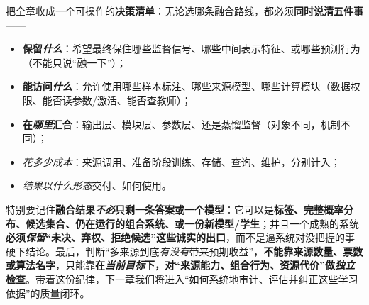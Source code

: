 把全章收成一个可操作的\textbf{决策清单}：无论选哪条融合路线，都必须\textbf{同时说清五件事}——
\begin{itemize}\item \textbf{保留\emph{什么}}：希望最终保住哪些监督信号、哪些中间表示特征、或哪些预测行为（不能只说“融一下”）；\item \textbf{能访问\emph{什么}}：允许使用哪些样本标注、哪些来源模型、哪些计算模块（数据权限、能否读参数/激活、能否查教师）；\item \textbf{在\emph{哪里}汇合}：输出层、模块层、参数层、还是蒸馏监督（对象不同，机制不同）；\item \emph{花多少成本}：来源调用、准备阶段训练、存储、查询、维护，分别计入；\item \emph{结果以什么形态}交付、如何使用。\end{itemize}
特别要记住\textbf{融合结果\emph{不必}只剩一条答案或一个模型}：它可以是\textbf{标签、完整概率分布、候选集合、仍在运行的组合系统、或一份新模型/学生}；并且一个成熟的系统\textbf{必须\emph{保留}“未决、弃权、拒绝候选”这些诚实的出口}，而不是逼系统对没把握的事硬下结论。最后，判断“多来源到底\emph{有没有}带来预期收益”，\textbf{不能靠来源数量、票数或算法名字}，只能靠\textbf{在\emph{当前目标}下，对“来源能力、组合行为、资源代价”做\emph{独立}检查}。带着这份纪律，下一章我们将进入“如何系统地审计、评估并纠正这些学习依据”的质量闭环。
